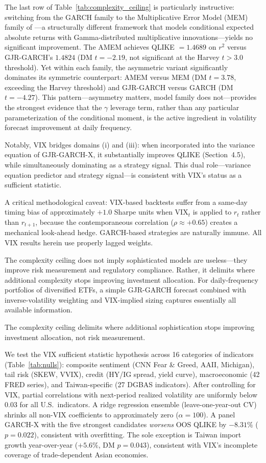 The last row of Table~\ref{tab:complexity_ceiling} is particularly instructive: switching from the GARCH family to the Multiplicative Error Model (MEM) family of \citet{engle2006}---a structurally different framework that models conditional expected absolute returns with Gamma-distributed multiplicative innovations---yields no significant improvement. The AMEM achieves QLIKE $= 1.4689$ on $r^2$ versus GJR-GARCH's $1.4824$ (DM $t = -2.19$, not significant at the Harvey $t > 3.0$ threshold). Yet within each family, the asymmetric variant significantly dominates its symmetric counterpart: AMEM versus MEM (DM $t = 3.78$, exceeding the Harvey threshold) and GJR-GARCH versus GARCH (DM $t = -4.27$). This pattern---asymmetry matters, model family does not---provides the strongest evidence that the $\gamma$ leverage term, rather than any particular parameterization of the conditional moment, is the active ingredient in volatility forecast improvement at daily frequency.

Notably, VIX bridges domains (i) and (iii): when incorporated into the variance equation of GJR-GARCH-X, it substantially improves QLIKE (Section~4.5), while simultaneously dominating as a strategy signal. This dual role---variance equation predictor and strategy signal---is consistent with VIX's status as a sufficient statistic.

A critical methodological caveat: VIX-based backtests suffer from a same-day timing bias of approximately $+1.0$ Sharpe units when $\text{VIX}_t$ is applied to $r_t$ rather than $r_{t+1}$, because the contemporaneous correlation ($\rho \approx +0.65$) creates a mechanical look-ahead hedge. GARCH-based strategies are naturally immune. All VIX results herein use properly lagged weights.

The complexity ceiling does not imply sophisticated models are useless---they improve risk measurement and regulatory compliance. Rather, it delimits where additional complexity stops improving investment allocation. For daily-frequency portfolios of diversified ETFs, a simple GJR-GARCH forecast combined with inverse-volatility weighting and VIX-implied sizing captures essentially all available information.

The complexity ceiling delimits where additional sophistication stops improving investment allocation, not risk measurement.

We test the VIX sufficient statistic hypothesis across 16 categories of indicators (Table~\ref{tab:nulls}): composite sentiment (CNN Fear \& Greed, AAII, Michigan), tail risk (SKEW, VVIX), credit (HY/IG spread, yield curve), macroeconomic (42 FRED series), and Taiwan-specific (27 DGBAS indicators). After controlling for VIX, partial correlations with next-period realized volatility are uniformly below 0.03 for all U.S.\ indicators. A ridge regression ensemble (leave-one-year-out CV) shrinks all non-VIX coefficients to approximately zero ($\alpha = 100$). A panel GARCH-X with the five strongest candidates \textit{worsens} OOS QLIKE by $-8.31\%$ ($p = 0.022$), consistent with overfitting. The sole exception is Taiwan import growth year-over-year ($+5.6\%$, DM $p = 0.043$), consistent with VIX's incomplete coverage of trade-dependent Asian economies.

